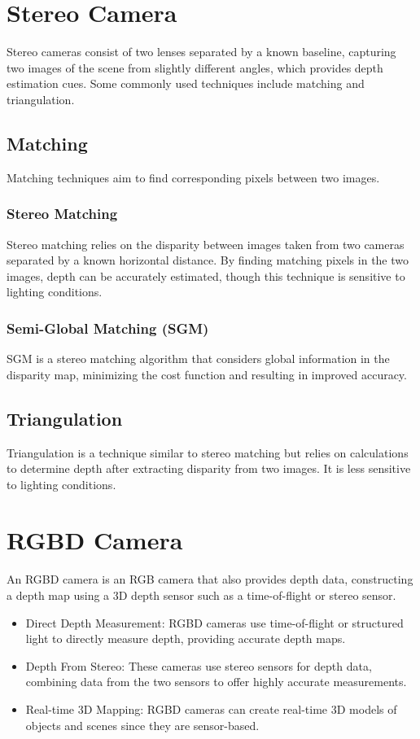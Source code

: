 \documentclass{article}
\begin{document}
\section{Stereo Camera}
Stereo cameras consist of two lenses separated by a known baseline, capturing two images of the scene from slightly different angles, which provides depth estimation cues. Some commonly used techniques include matching and triangulation.

\subsection{Matching}
Matching techniques aim to find corresponding pixels between two images.

\subsubsection{Stereo Matching}
Stereo matching relies on the disparity between images taken from two cameras separated by a known horizontal distance. By finding matching pixels in the two images, depth can be accurately estimated, though this technique is sensitive to lighting conditions.

\subsubsection{Semi-Global Matching (SGM)}
SGM is a stereo matching algorithm that considers global information in the disparity map, minimizing the cost function and resulting in improved accuracy.

\subsection{Triangulation}
Triangulation is a technique similar to stereo matching but relies on calculations to determine depth after extracting disparity from two images. It is less sensitive to lighting conditions.

\section{RGBD Camera}
An RGBD camera is an RGB camera that also provides depth data, constructing a depth map using a 3D depth sensor such as a time-of-flight or stereo sensor.
\begin{itemize}
	\item Direct Depth Measurement:
RGBD cameras use time-of-flight or structured light to directly measure depth, providing accurate depth maps.

	\item Depth From Stereo:
These cameras use stereo sensors for depth data, combining data from the two sensors to offer highly accurate measurements.

	\item Real-time 3D Mapping:
RGBD cameras can create real-time 3D models of objects and scenes since they are sensor-based.
\end{itemize}
\end{document}
